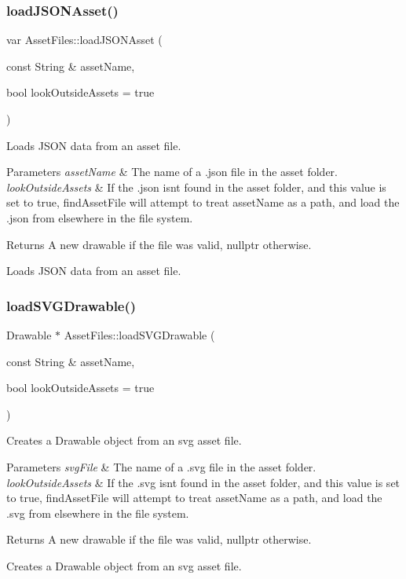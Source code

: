 \subsubsection{\texorpdfstring{load\+J\+S\+O\+N\+Asset()}{loadJSONAsset()}}
{\footnotesize\ttfamily var Asset\+Files\+::load\+J\+S\+O\+N\+Asset (\begin{DoxyParamCaption}\item[{const String \&}]{asset\+Name,  }\item[{bool}]{look\+Outside\+Assets = {\ttfamily true} }\end{DoxyParamCaption})}

Loads J\+S\+ON data from an asset file.


\begin{DoxyParams}{Parameters}
{\em asset\+Name} & The name of a .json file in the asset folder.\\
\hline
{\em look\+Outside\+Assets} & If the .json isn\textquotesingle{}t found in the asset folder, and this value is set to true, find\+Asset\+File will attempt to treat asset\+Name as a path, and load the .json from elsewhere in the file system.\\
\hline
\end{DoxyParams}
\begin{DoxyReturn}{Returns}
A new drawable if the file was valid, nullptr otherwise.
\end{DoxyReturn}
Loads J\+S\+ON data from an asset file. \mbox{\label{namespaceAssetFiles_a8975b48c898f7f632c8a617543c21690}} 
\subsubsection{\texorpdfstring{load\+S\+V\+G\+Drawable()}{loadSVGDrawable()}}
{\footnotesize\ttfamily Drawable $\ast$ Asset\+Files\+::load\+S\+V\+G\+Drawable (\begin{DoxyParamCaption}\item[{const String \&}]{asset\+Name,  }\item[{bool}]{look\+Outside\+Assets = {\ttfamily true} }\end{DoxyParamCaption})}

Creates a Drawable object from an svg asset file.


\begin{DoxyParams}{Parameters}
{\em svg\+File} & The name of a .svg file in the asset folder.\\
\hline
{\em look\+Outside\+Assets} & If the .svg isn\textquotesingle{}t found in the asset folder, and this value is set to true, find\+Asset\+File will attempt to treat asset\+Name as a path, and load the .svg from elsewhere in the file system.\\
\hline
\end{DoxyParams}
\begin{DoxyReturn}{Returns}
A new drawable if the file was valid, nullptr otherwise.
\end{DoxyReturn}
Creates a Drawable object from an svg asset file. 
